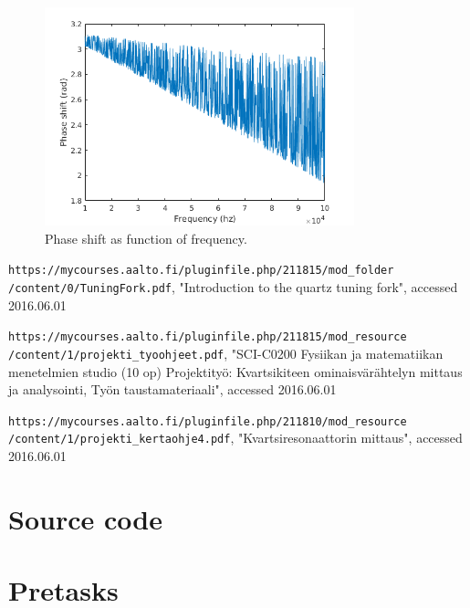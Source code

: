 \documentclass[12pt]{article}
\begin{document}
\begin{figure}[!ht]
\centering
\includegraphics[width = 0.8\textwidth]{kuvat/f-ps.png}
\caption{Phase shift as function of frequency.}
\label{fig:f-ps}
\end{figure}

\newpage

\begin{thebibliography}{1}
 \texttt{https://mycourses.aalto.fi/pluginfile.php/211815/mod\_folder\\/content/0/TuningFork.pdf}, "Introduction to the quartz tuning fork", accessed 2016.06.01

 \texttt{https://mycourses.aalto.fi/pluginfile.php/211815/mod\_resource\\/content/1/projekti\_tyoohjeet.pdf}, "SCI-C0200 Fysiikan ja matematiikan menetelmien studio (10 op)
Projektityö: Kvartsikiteen ominaisvärähtelyn mittaus ja analysointi, Työn taustamateriaali", accessed 2016.06.01

 \texttt{https://mycourses.aalto.fi/pluginfile.php/211810/mod\_resource\\/content/1/projekti\_kertaohje4.pdf}, "Kvartsiresonaattorin mittaus", accessed 2016.06.01
\end{thebibliography}

\newpage
\appendix

\section{Source code}


%

\section{Pretasks}
\end{document}
